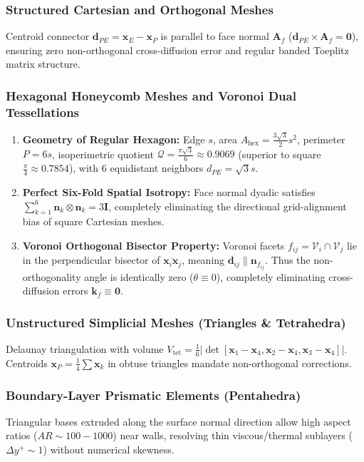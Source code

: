 \documentclass[11pt,a4paper]{article}
\begin{document}
\subsubsection{Structured Cartesian and Orthogonal Meshes}
Centroid connector $\mathbf{d}_{PE} = \mathbf{x}_E - \mathbf{x}_P$ is parallel to face normal $\mathbf{A}_f$ ($\mathbf{d}_{PE} \times \mathbf{A}_f = \mathbf{0}$), ensuring zero non-orthogonal cross-diffusion error and regular banded Toeplitz matrix structure.

\subsubsection{Hexagonal Honeycomb Meshes and Voronoi Dual Tessellations}
\begin{enumerate}[leftmargin=*]
    \item \textbf{Geometry of Regular Hexagon:} Edge $s$, area $A_{\text{hex}} = \frac{3\sqrt{3}}{2} s^2$, perimeter $P = 6s$, isoperimetric quotient $\mathcal{Q} = \frac{\pi \sqrt{3}}{6} \approx 0.9069$ (superior to square $\frac{\pi}{4} \approx 0.7854$), with 6 equidistant neighbors $d_{PE} = \sqrt{3} s$.
    \item \textbf{Perfect Six-Fold Spatial Isotropy:} Face normal dyadic satisfies $\sum_{k=1}^6 \mathbf{n}_k \otimes \mathbf{n}_k = 3 \mathbf{I}$, completely eliminating the directional grid-alignment bias of square Cartesian meshes.
    \item \textbf{Voronoi Orthogonal Bisector Property:} Voronoi facets $f_{ij} = \mathcal{V}_i \cap \mathcal{V}_j$ lie in the perpendicular bisector of $\overline{\mathbf{x}_i \mathbf{x}_j}$, meaning $\mathbf{d}_{ij} \parallel \mathbf{n}_{f_{ij}}$. Thus the non-orthogonality angle is identically zero ($\theta \equiv 0$), completely eliminating cross-diffusion errors $\mathbf{k}_f \equiv \mathbf{0}$.
\end{enumerate}

\subsubsection{Unstructured Simplicial Meshes (Triangles \& Tetrahedra)}
Delaunay triangulation with volume $V_{\text{tet}} = \frac{1}{6} \left| \det[\mathbf{x}_1 - \mathbf{x}_4, \mathbf{x}_2 - \mathbf{x}_4, \mathbf{x}_3 - \mathbf{x}_4] \right|$. Centroids $\mathbf{x}_P = \frac{1}{4} \sum \mathbf{x}_k$ in obtuse triangles mandate non-orthogonal corrections.

\subsubsection{Boundary-Layer Prismatic Elements (Pentahedra)}
Triangular bases extruded along the surface normal direction allow high aspect ratios ($AR \sim 100 - 1000$) near walls, resolving thin viscous/thermal sublayers ($\Delta y^+ \sim 1$) without numerical skewness.
\end{document}
